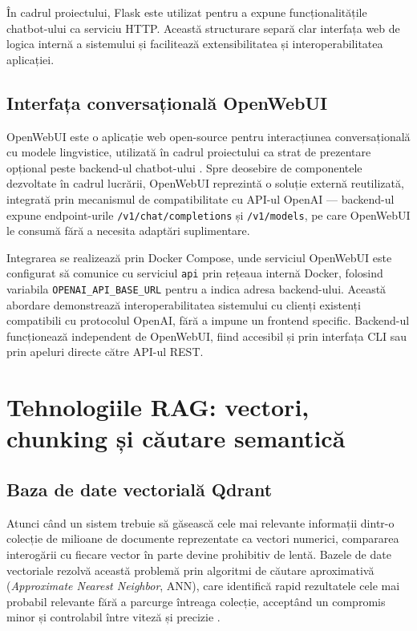 \documentclass[12pt, a4paper, oneside, romanian]{teza-upb}
\begin{document}
În cadrul proiectului, Flask este utilizat pentru a expune funcționalitățile chatbot-ului ca serviciu HTTP. Această structurare separă clar interfața web de logica internă a sistemului și facilitează extensibilitatea și interoperabilitatea aplicației.
\subsection{Interfața conversațională OpenWebUI}

OpenWebUI este o aplicație web open-source pentru interacțiunea conversațională 
cu modele lingvistice, utilizată în cadrul proiectului ca strat de prezentare 
opțional peste backend-ul chatbot-ului \cite{openwebui_doc}. Spre deosebire de 
componentele dezvoltate în cadrul lucrării, OpenWebUI reprezintă o soluție 
externă reutilizată, integrată prin mecanismul de compatibilitate cu API-ul 
OpenAI — backend-ul expune endpoint-urile \texttt{/v1/chat/completions} și 
\texttt{/v1/models}, pe care OpenWebUI le consumă fără a necesita adaptări 
suplimentare.

Integrarea se realizează prin Docker Compose, unde serviciul OpenWebUI este 
configurat să comunice cu serviciul \texttt{api} prin rețeaua internă Docker, 
folosind variabila \texttt{OPENAI\_API\_BASE\_URL} pentru a indica adresa 
backend-ului. Această abordare demonstrează interoperabilitatea sistemului cu 
clienți existenți compatibili cu protocolul OpenAI, fără a impune un frontend 
specific. Backend-ul funcționează independent de OpenWebUI, fiind accesibil 
și prin interfața CLI sau prin apeluri directe către API-ul REST.

\section{Tehnologiile RAG: vectori, chunking și căutare semantică}

\subsection{Baza de date vectorială Qdrant}

Atunci când un sistem trebuie să găsească cele mai relevante informații 
dintr-o colecție de milioane de documente reprezentate ca vectori numerici, 
compararea interogării cu fiecare vector în parte devine prohibitiv de lentă. 
Bazele de date vectoriale rezolvă această problemă prin algoritmi de căutare 
aproximativă (\textit{Approximate Nearest Neighbor}, ANN), care identifică 
rapid rezultatele cele mai probabil relevante fără a parcurge întreaga 
colecție, acceptând un compromis minor și controlabil între viteză și 
precizie \cite{malkov2018hnsw}.
\end{document}

